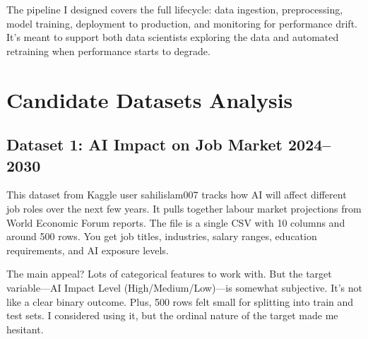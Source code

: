 \documentclass[11pt,a4paper]{article}
\begin{document}
The pipeline I designed covers the full lifecycle: data ingestion, preprocessing, model 
training, deployment to production, and monitoring for performance drift. It's meant to 
support both data scientists exploring the data and automated retraining when performance 
starts to degrade.

\section{Candidate Datasets Analysis}

\subsection{Dataset 1: AI Impact on Job Market 2024--2030}

This dataset from Kaggle user sahilislam007 \citep{sahilislam2024} tracks how AI will 
affect different job roles over the next few years. It pulls together labour market 
projections from World Economic Forum reports. The file is a single CSV with 10 columns 
and around 500 rows. You get job titles, industries, salary ranges, education requirements, 
and AI exposure levels. 

The main appeal? Lots of categorical features to work with. But the target variable—AI Impact 
Level (High/Medium/Low)—is somewhat subjective. It's not like a clear binary outcome. Plus, 
500 rows felt small for splitting into train and test sets. I considered using it, but the 
ordinal nature of the target made me hesitant.
\end{document}
